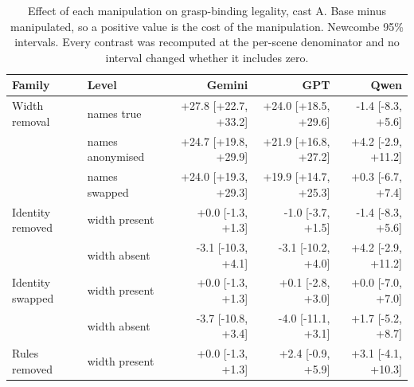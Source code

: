 \begin{table}[H]
  \centering
  \caption{Effect of each manipulation on grasp-binding legality, cast A. Base minus manipulated, so a positive value is the cost of the manipulation. Newcombe 95\% intervals. Every contrast was recomputed at the per-scene denominator and no interval changed whether it includes zero.}
  \label{tab:ex1:gaps}
  \small
  \begin{tabular}{llrrr}
    \toprule
    Family & Level & Gemini & GPT & Qwen \\
    \midrule
    Width removal & names true & +27.8 [+22.7, +33.2] & +24.0 [+18.5, +29.6] & -1.4 [-8.3, +5.6] \\
     & names anonymised & +24.7 [+19.8, +29.9] & +21.9 [+16.8, +27.2] & +4.2 [-2.9, +11.2] \\
     & names swapped & +24.0 [+19.3, +29.3] & +19.9 [+14.7, +25.3] & +0.3 [-6.7, +7.4] \\
    Identity removed & width present & +0.0 [-1.3, +1.3] & -1.0 [-3.7, +1.5] & -1.4 [-8.3, +5.6] \\
     & width absent & -3.1 [-10.3, +4.1] & -3.1 [-10.2, +4.0] & +4.2 [-2.9, +11.2] \\
    Identity swapped & width present & +0.0 [-1.3, +1.3] & +0.1 [-2.8, +3.0] & +0.0 [-7.0, +7.0] \\
     & width absent & -3.7 [-10.8, +3.4] & -4.0 [-11.1, +3.1] & +1.7 [-5.2, +8.7] \\
    Rules removed & width present & +0.0 [-1.3, +1.3] & +2.4 [-0.9, +5.9] & +3.1 [-4.1, +10.3] \\
    \bottomrule
  \end{tabular}
\end{table}
